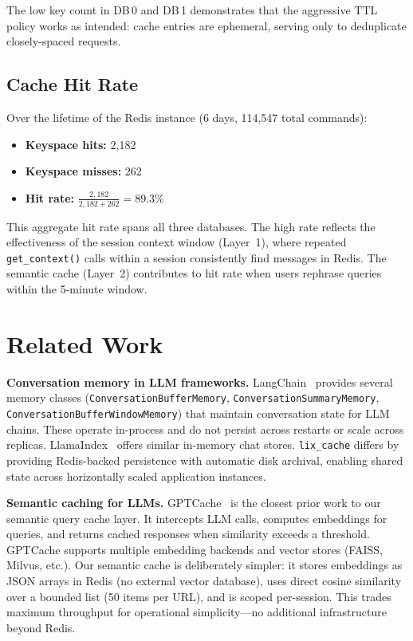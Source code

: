 \documentclass[conference]{IEEEtran}
\begin{document}
The low key count in DB\,0 and DB\,1 demonstrates that the aggressive TTL policy works as intended: cache entries are ephemeral, serving only to deduplicate closely-spaced requests.

\subsection{Cache Hit Rate}

Over the lifetime of the Redis instance (6 days, 114{,}547 total commands):

\begin{itemize}
\item \textbf{Keyspace hits:} 2{,}182
\item \textbf{Keyspace misses:} 262
\item \textbf{Hit rate:} $\frac{2{,}182}{2{,}182 + 262} = \mathbf{89.3\%}$
\end{itemize}

This aggregate hit rate spans all three databases. The high rate reflects the effectiveness of the session context window (Layer~1), where repeated \texttt{get\_context()} calls within a session consistently find messages in Redis. The semantic cache (Layer~2) contributes to hit rate when users rephrase queries within the 5-minute window.

\section{Related Work}
\label{sec:related}

\textbf{Conversation memory in LLM frameworks.}
LangChain~\cite{langchain2023} provides several memory classes (\texttt{ConversationBufferMemory}, \texttt{ConversationSummaryMemory}, \texttt{ConversationBufferWindowMemory}) that maintain conversation state for LLM chains. These operate in-process and do not persist across restarts or scale across replicas. LlamaIndex~\cite{llamaindex2023} offers similar in-memory chat stores. \texttt{lix\_cache} differs by providing Redis-backed persistence with automatic disk archival, enabling shared state across horizontally scaled application instances.

\textbf{Semantic caching for LLMs.}
GPTCache~\cite{gptcache2023} is the closest prior work to our semantic query cache layer. It intercepts LLM calls, computes embeddings for queries, and returns cached responses when similarity exceeds a threshold. GPTCache supports multiple embedding backends and vector stores (FAISS, Milvus, etc.). Our semantic cache is deliberately simpler: it stores embeddings as JSON arrays in Redis (no external vector database), uses direct cosine similarity over a bounded list (50 items per URL), and is scoped per-session. This trades maximum throughput for operational simplicity---no additional infrastructure beyond Redis.
\end{document}

